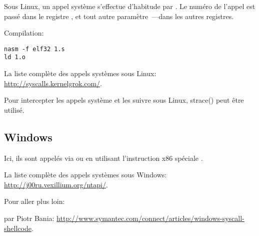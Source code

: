 Sous Linux, un appel système s'effectue d'habitude par .
Le numéro de l'appel est passé dans le registre \EAX, et tout autre paramètre~---dans
les autres registres.



Compilation:

\begin{lstlisting}
nasm -f elf32 1.s
ld 1.o
\end{lstlisting}

La liste complète des appels systèmes sous Linux: \url{http://syscalls.kernelgrok.com/}.

Pour intercepter les appels système et les suivre sous Linux, strace()
peut être utilisé.

\subsection{Windows}


Ici, ils sont appelés via  ou en utilisant l'instruction x86 spéciale
.

La liste complète des appels systèmes sous Windows: \url{http://j00ru.vexillium.org/ntapi/}.

Pour aller plus loin:

 par Piotr Bania: \url{http://www.symantec.com/connect/articles/windows-syscall-shellcode}.

